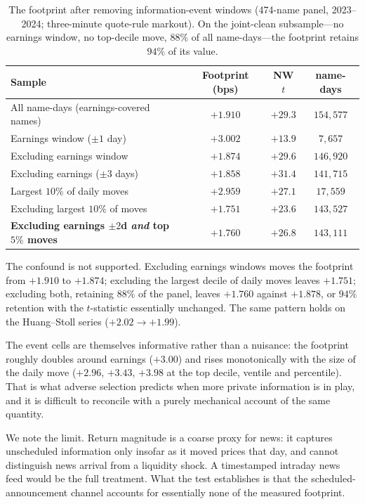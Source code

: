 \documentclass[11pt]{article}
\begin{document}
\begin{table}[htbp]
\centering
\begin{tabular}{lccc}
\toprule
\textbf{Sample} & \textbf{Footprint (bps)} & \textbf{NW $t$} & \textbf{name-days} \\
\midrule
All name-days (earnings-covered names) & $+1.910$ & $+29.3$ & $154{,}577$ \\
\midrule
\quad Earnings window ($\pm1$ day) & $+3.002$ & $+13.9$ & $7{,}657$ \\
\quad Excluding earnings window & $+1.874$ & $+29.6$ & $146{,}920$ \\
\quad Excluding earnings ($\pm3$ days) & $+1.858$ & $+31.4$ & $141{,}715$ \\
\midrule
\quad Largest $10\%$ of daily moves & $+2.959$ & $+27.1$ & $17{,}559$ \\
\quad Excluding largest $10\%$ of moves & $+1.751$ & $+23.6$ & $143{,}527$ \\
\midrule
\textbf{Excluding earnings $\pm2$d \emph{and} top $5\%$ moves} & $\mathbf{+1.760}$ & $\mathbf{+26.8}$ & $143{,}111$ \\
\bottomrule
\end{tabular}
\caption{The footprint after removing information-event windows (474-name panel,
2023--2024; three-minute quote-rule markout). On the joint-clean subsample---no earnings
window, no top-decile move, $88\%$ of all name-days---the footprint retains $94\%$ of its
value.}
\label{tab:news}
\end{table}

The confound is not supported. Excluding earnings windows moves the footprint from $+1.910$
to $+1.874$; excluding the largest decile of daily moves leaves $+1.751$; excluding both,
retaining $88\%$ of the panel, leaves $+1.760$ against $+1.878$, or $94\%$ retention with
the $t$-statistic essentially unchanged. The same pattern holds on the Huang--Stoll series
($+2.02 \to +1.99$).

The event cells are themselves informative rather than a nuisance: the footprint roughly
doubles around earnings ($+3.00$) and rises monotonically with the size of the daily move
($+2.96$, $+3.43$, $+3.98$ at the top decile, ventile and percentile). That is what adverse
selection predicts when more private information is in play, and it is difficult to
reconcile with a purely mechanical account of the same quantity.

We note the limit. Return magnitude is a coarse proxy for news: it captures unscheduled
information only insofar as it moved prices that day, and cannot distinguish news arrival
from a liquidity shock. A timestamped intraday news feed would be the full treatment. What
the test establishes is that the scheduled-announcement channel accounts for essentially
none of the measured footprint.
\end{document}
